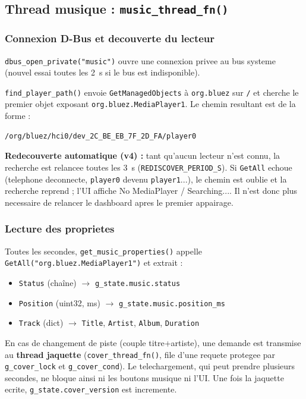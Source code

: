 \documentclass[a4paper,11pt]{article}
\begin{document}
\subsection{Thread musique : \texttt{music\_thread\_fn()}}

\subsubsection{Connexion D-Bus et decouverte du lecteur}

\texttt{dbus\_open\_private("music")} ouvre une connexion privee au bus systeme (nouvel
essai toutes les 2~s si le bus est indisponible).

\texttt{find\_player\_path()} envoie \texttt{GetManagedObjects} à \texttt{org.bluez}
sur \texttt{/} et cherche le premier objet exposant \texttt{org.bluez.MediaPlayer1}.
Le chemin resultant est de la forme :

\begin{verbatim}
/org/bluez/hci0/dev_2C_BE_EB_7F_2D_FA/player0
\end{verbatim}

\textbf{Redecouverte automatique (v4) :} tant qu'aucun lecteur n'est connu, la recherche
est relancee toutes les 3~s (\texttt{REDISCOVER\_PERIOD\_S}). Si \texttt{GetAll} echoue
(telephone deconnecte, \texttt{player0} devenu \texttt{player1}...), le chemin est oublie
et la recherche reprend ; l'UI affiche \og No MediaPlayer / Searching...\fg{}. Il n'est
donc plus necessaire de relancer le dashboard apres le premier appairage.

\subsubsection{Lecture des proprietes}

Toutes les secondes, \texttt{get\_music\_properties()} appelle
\texttt{GetAll("org.bluez.MediaPlayer1")} et extrait :

\begin{itemize}
  \item \texttt{Status} (chaîne) $\to$ \texttt{g\_state.music.status}
  \item \texttt{Position} (uint32, ms) $\to$ \texttt{g\_state.music.position\_ms}
  \item \texttt{Track} (dict) $\to$ \texttt{Title}, \texttt{Artist}, \texttt{Album},
    \texttt{Duration}
\end{itemize}

En cas de changement de piste (couple titre+artiste), une demande est transmise au
\textbf{thread jaquette} (\texttt{cover\_thread\_fn()}, file d'une requete protegee par
\texttt{g\_cover\_lock} et \texttt{g\_cover\_cond}). Le telechargement, qui peut prendre
plusieurs secondes, ne bloque ainsi ni les boutons musique ni l'UI. Une fois la jaquette
ecrite, \texttt{g\_state.cover\_version} est incremente.
\end{document}
